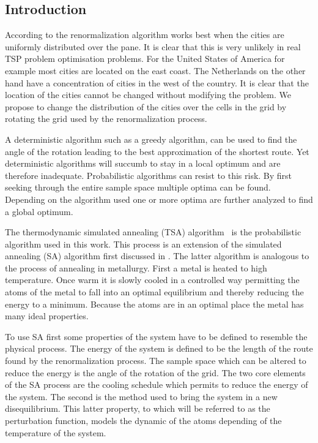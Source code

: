 \subsection{Introduction}
According to \cite{yoshiyuki1995nms} the renormalization algorithm works best
when the cities are uniformly distributed over the pane. It is clear that this
is very unlikely in real TSP problem optimisation problems. For the United States of
America for example most cities are located on the east coast. The Netherlands
on the other hand have a concentration of cities in the west of the country.
It is clear that the location of the cities cannot be changed without
modifying the problem. We propose to change the distribution of the cities
over the cells in the grid by rotating the grid used by the renormalization
process.

A deterministic algorithm such as a greedy algorithm, can be used to find the
angle of the rotation leading to the best approximation of the shortest route. Yet
deterministic algorithms will succumb to stay in a local optimum and are
therefore inadequate. Probabilistic algorithms can resist to this risk. By
first seeking through the entire sample space multiple optima can be found.
Depending on the algorithm used one or more optima are further analyzed to
find a global optimum.

The thermodynamic simulated annealing (TSA) algorithm
\cite{devicente2003pts}~is the probabilistic algorithm used in this work. This
process is an extension of the simulated annealing (SA) algorithm first
discussed in \cite{kirkpatrick83}. The latter algorithm is analogous to the
process of annealing in metallurgy. First a metal is heated to high
temperature. Once warm it is slowly cooled in a controlled way permitting the
atoms of the metal to fall into an optimal equilibrium and thereby reducing
the energy to a minimum. Because the atoms are in an optimal place the metal
has many ideal properties. 

To use SA first some properties of the system have to be defined to resemble
the physical process. The energy of the system is defined to be the length of
the route found by the renormalization process. The sample space which can be
altered to reduce the energy is the angle of the rotation of the grid.  The
two core elements of the SA process are the cooling schedule which permits to
reduce the energy of the system. The second is the method used to bring the
system in a new disequilibrium. This latter property, to which will be
referred to as the perturbation function, models the dynamic of the atoms
depending of the temperature of the system.

